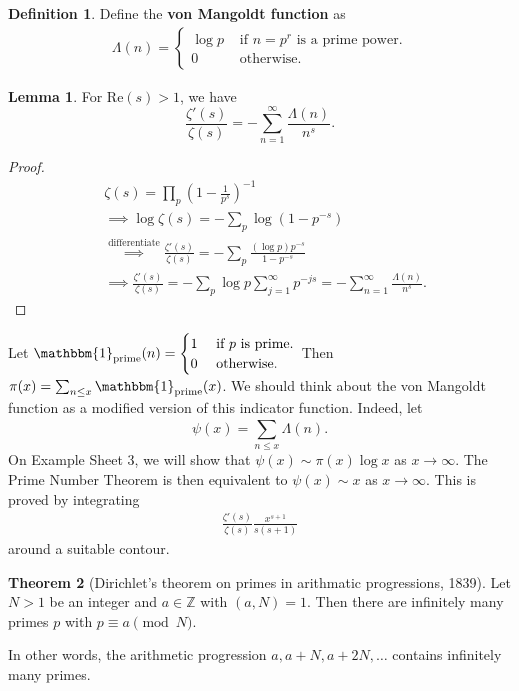 \documentclass{article}
\theoremstyle{definition}
\newtheorem{theorem}{Theorem}[section]
\newtheorem{lemma}[theorem]{Lemma}
\newtheorem{defn}{Definition}[section]
\begin{document}
\begin{defn}
    Define the \textbf{von Mangoldt function} as 
    \begin{align*}
        \Lambda(n) = \begin{cases}
            \log p &\text{ if } n=p^r \text{ is a prime power.}\\
            0 &\text{ otherwise.}
        \end{cases}
    \end{align*} 
\end{defn}
\begin{lemma}
    For $\text{Re}(s)>1$, we have \[
    \frac{\zeta'(s)}{\zeta(s)} = -\sum_{n=1}^{\infty} \frac{\Lambda(n)}{n^s}.
    \]
\end{lemma}
\begin{proof}
    \begin{align*}
        &\zeta(s) = \prod_{p}^{} \left(1-\frac{1}{p^s}\right)^{-1} \\
        &\implies \log \zeta(s) = -\sum_{p}^{} \log (1-p^{-s}) \\
        &\stackrel{\text{differentiate}}{\implies}  \frac{\zeta'(s)}{\zeta(s)} =- \sum_{p}^{} \frac{(\log p)p^{-s}}{1-p^{-s}} \\
        &\implies \frac{\zeta'(s)}{\zeta(s)} = -\sum_{p}^{} \log p \sum_{j=1}^{\infty} p^{-js} = - \sum_{n=1}^{\infty} \frac{\Lambda(n)}{n^s}.
    \end{align*}
\end{proof}
Let $\mathbbm{1}_{\text{prime}}(n) = \begin{cases}
    1 &\text{ if }p \text{ is prime.}\\
    0 &\text{ otherwise}.
\end{cases}$ Then $\pi(x) = \sum_{n\le x}^{} \mathbbm{1}_{\text{prime}}(x)$. We should think about the von Mangoldt function as a modified version of this indicator function. Indeed, let 
\[
    \psi(x) = \sum_{n\le x}^{} \Lambda(n).  
\]
On Example Sheet 3, we will show that $\psi(x) \sim \pi(x)\log x$ as $x \to \infty$. The Prime Number Theorem is then equivalent to $\psi(x) \sim x$ as $x \to \infty$. This is proved by integrating 
\begin{align*}
    \frac{\zeta'(s)}{\zeta(s)} \frac{x^{s+1}}{s(s+1)}
\end{align*} 
around a suitable contour.
\begin{theorem}[Dirichlet's theorem on primes in arithmatic progressions, 1839]
    Let $N>1$ be an integer and $a \in \mathbb{Z}$ with $(a,N)=1$. Then there are infinitely many primes $p$ with $p \equiv a \pmod{N}$.

    In other words, the arithmetic progression $a, a+N, a+2N,\ldots$ contains infinitely many primes.
\end{theorem}
\end{document}
